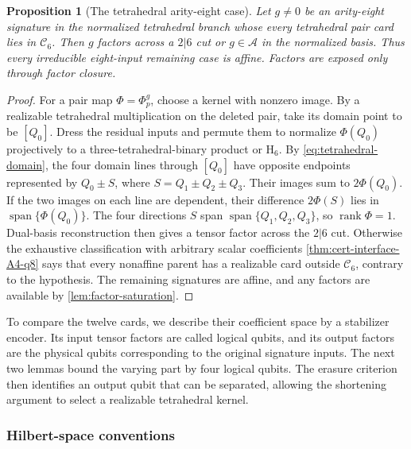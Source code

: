 \documentclass[11pt,letterpaper,onecolumn]{article}
\theoremstyle{plain}
\newtheorem{proposition}[proposition]{Proposition}
\theoremstyle{definition}
\theoremstyle{remark}
\newcommand{\cA}{\mathscr A}
\newcommand{\Span}{\operatorname{span}}
\newcommand{\rank}{\operatorname{rank}}
\newcommand{\Hcore}{\mathrm{H}_6}
\begin{document}
\begin{proposition}[The tetrahedral arity-eight case]
\label{prop:a4rel-required-eight-port}
Let \(g\ne0\) be an arity-eight signature in the normalized tetrahedral
branch whose every tetrahedral pair card lies in \(\mathscr C_6\).
Then \(g\) factors across a \(2|6\) cut or \(g\in\cA\) in the normalized
basis.  Thus every irreducible eight-input remaining case is affine. Factors are
exposed only through factor closure.
\end{proposition}

\begin{proof}
For a pair map \(\Phi=\Phi_p^g\), choose a kernel with nonzero image.
By a realizable tetrahedral multiplication on the deleted pair, take its
domain point to be \([Q_0]\). Dress the residual inputs and permute them to
normalize \(\Phi(Q_0)\) projectively to a three-tetrahedral-binary product
or \(\Hcore\). By \cref{eq:tetrahedral-domain}, the four domain lines
through \([Q_0]\) have opposite endpoints represented by \(Q_0\pm S\),
where \(S=Q_1\pm Q_2\pm Q_3\). Their images sum to \(2\Phi(Q_0)\).
If the two images on each line are dependent, their difference
\(2\Phi(S)\) lies in \(\Span\{\Phi(Q_0)\}\). The four directions \(S\)
span \(\Span\{Q_1,Q_2,Q_3\}\), so \(\rank\Phi=1\). Dual-basis
reconstruction then gives a tensor factor across the \(2|6\) cut. Otherwise the
exhaustive classification with arbitrary scalar coefficients
\cref{thm:cert-interface-A4-q8} says that every nonaffine parent has
a realizable card outside \(\mathscr C_6\), contrary to the hypothesis.
The remaining signatures are affine, and any factors are available by
\cref{lem:factor-saturation}.
\end{proof}

To compare the twelve cards, we describe their coefficient space by a
stabilizer encoder. Its input tensor factors are called logical qubits,
and its output factors are the physical qubits corresponding to the
original signature inputs. The next two lemmas bound the varying part by
four logical qubits. The erasure criterion then identifies an output
qubit that can be separated, allowing the shortening argument to select
a realizable tetrahedral kernel.


\subsubsection{Hilbert-space conventions}
\label{subsubsec:hilbert-conventions}
\label{subsec:stabilizer-conventions}
\end{document}

